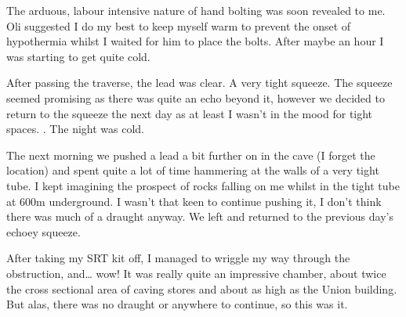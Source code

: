 The arduous, labour intensive nature of hand bolting was soon revealed to me. Oli suggested I do my best to keep myself warm to prevent the onset of hypothermia whilst I waited for him to place the bolts. After maybe an hour I was starting to get quite cold. 

After passing the traverse, the lead was clear. A very tight squeeze. The squeeze seemed promising as there was quite an echo beyond it, however we decided to return to the squeeze the next day as at least I wasn’t in the mood for tight spaces. . The night was cold. 

The next morning we pushed a lead a bit further on in the cave (I forget the location)  and spent quite a lot of time hammering at the walls of a very tight tube. I kept imagining the prospect of rocks falling on me whilst in the tight tube at 600m underground. I wasn’t that keen to continue pushing it, I don’t think there was much of a draught anyway. We left and returned to the previous day’s echoey squeeze. 

After taking my SRT kit off, I managed to wriggle my way through the obstruction, and… wow! It was really quite an impressive chamber, about twice the cross sectional area of caving stores and about as high as the Union building. But alas, there was no draught or anywhere to continue, so this was it. 


